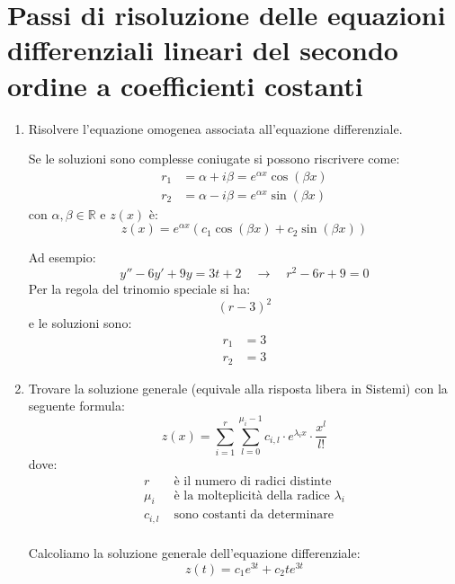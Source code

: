 \documentclass{article}
\begin{document}
\tableofcontents
\pagebreak

\section{Passi di risoluzione delle equazioni differenziali lineari del secondo ordine a
coefficienti costanti}
\begin{enumerate}
  \item Risolvere l'equazione omogenea associata all'equazione differenziale.

    Se le soluzioni sono complesse coniugate si possono riscrivere come:
    \[
      \begin{aligned}
        r_1 &= \alpha + i \beta = e^{\alpha x} \cos(\beta x) \\
        r_2 &= \alpha - i \beta = e^{\alpha x} \sin(\beta x)
      \end{aligned}
    \] 
    con \( \alpha, \beta \in \mathbb{R} \) e \( z(x) \) è:
    \[
      z(x) = e^{\alpha x} \left( c_1 \cos(\beta x) + c_2 \sin(\beta x) \right)
    \] 

    \begin{example}
      Ad esempio:
      \[
        y''-6y'+9y = 3t+2 \quad \to \quad r^2 - 6r + 9 = 0
      \] 
      Per la regola del trinomio speciale si ha:
      \[
        \left( r-3 \right)^2
      \] 
      e le soluzioni sono:
      \[
        \begin{aligned}
          r_1 &= 3 \\
          r_2 &= 3
        \end{aligned}
      \] 
    \end{example}

  \item Trovare la soluzione generale (equivale alla risposta libera in Sistemi)
    con la seguente formula:
      \[
        z(x) = \sum_{i=1}^{r} \sum_{l=0}^{\mu_i -1} c_{i,l} \cdot 
        e^{\lambda_i x} \cdot \frac{x^l}{l!}
      \] 
      dove:
      \[
      \begin{aligned}
        r &\text{ è il numero di radici distinte} \\
        \mu_i &\text{ è la molteplicità della radice } \lambda_i \\
        c_{i,l} &\text{ sono costanti da determinare} \\
      \end{aligned}
      \] 
    \begin{example}
      Calcoliamo la soluzione generale dell'equazione differenziale:
      \[
        z(t) = c_1 e^{3t} + c_2 t e^{3t}
      \] 
    \end{example}


\end{enumerate}
\end{document}
